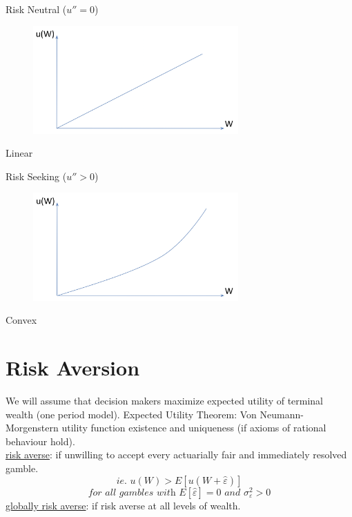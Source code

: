 \documentclass[
14pt,notheorems,hyperref={pdfauthor=whatever}
]{beamer}
\begin{document}
\begin{frame}
Risk Neutral ($u''=0$)\\
\begin{figure}[l2-rn]
    \includegraphics[width=0.7\textwidth]{L1-riskneutral}
    \centering
\end{figure}
Linear\\
\end{frame}

\begin{frame}
Risk Seeking ($u''>0$)\\
\begin{figure}[l2-rs]
    \includegraphics[width=0.7\textwidth]{L1-riskseeker}
    \centering
\end{figure}
Convex\\
\end{frame}

\section{Risk Aversion}
\begin{frame}
We will assume that decision makers maximize expected utility of terminal wealth (one period model). Expected Utility Theorem: Von Neumann-Morgenstern utility function existence and uniqueness (if axioms of rational behaviour hold).\\
\hfill \break
\underline{risk averse}: if unwilling to accept every actuarially fair and immediately resolved gamble.\\
\[\textit{ie. } u(W) > E[u(W+\hat{\varepsilon})]\]
\[\textit{for all gambles with $E[\hat{\varepsilon}]=0$ and $\sigma_\varepsilon^2 >0$}\]
\hfill \break
\underline{globally risk averse}: if risk averse at all levels of wealth.\\
\end{frame}
\end{document}
